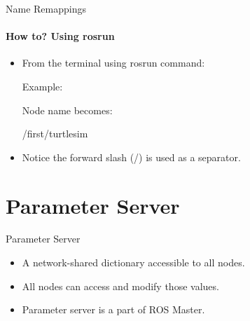 \documentclass{beamer}
\begin{document}
\begin{frame}{Name Remappings}
    \framesubtitle{How to? Using rosrun}
    \begin{itemize}     
        \item From the terminal using {\ttfamily \colorbox{gray!30!white}{rosrun}} command:
        \begin{terminal}
            \color{green} \fontsize{9}{1} 
        \end{terminal} 
        
        Example:
        \begin{terminal}
            \color{green} \fontsize{9}{1} 
        \end{terminal} 
        
        
        Node name becomes:
        \begin{focus}
            /first/turtlesim  
        \end{focus}
        \item Notice the forward slash (/) is used as a separator.
    \end{itemize}  
\end{frame}





\section{Parameter Server}

\begin{frame}{Parameter Server}
    \begin{itemize}
        \item A network-shared dictionary accessible to all nodes.
        \item  All nodes can access and modify those values.
        \item Parameter server is a part of ROS Master.
    \end{itemize}  
\end{frame}
\end{document}
